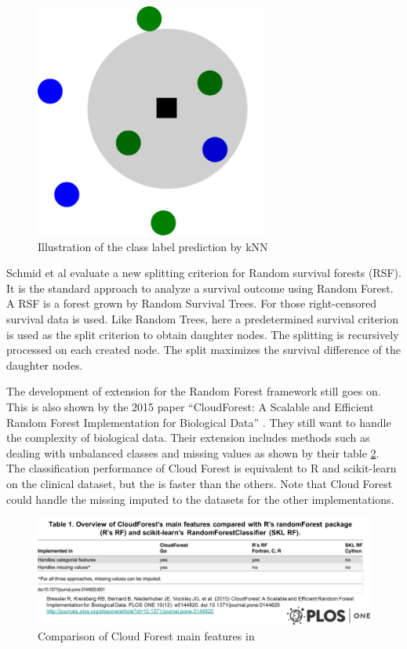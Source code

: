 \documentclass{sig-alternate-05-2015}
\begin{document}
\begin{figure}
\centering
\includegraphics[width=3in]{kNN}
\caption{Illustration of the class label prediction by kNN}
\label{fig:kNN}
\end{figure}

Schmid et al \cite{Schmid2016450} evaluate a new splitting criterion for Random survival forests (RSF). It is the standard approach to analyze a survival outcome using Random Forest. A RSF is a forest grown by Random Survival Trees. For those right-censored
survival data is used. Like Random Trees, here a predetermined survival criterion is used as the split criterion to obtain daughter nodes. The splitting is recursively processed on each created node. The split maximizes the survival difference of the daughter nodes. 

The development of extension for the Random Forest framework still goes on. This is also shown by the 2015 paper ``CloudForest: A Scalable and Efficient Random Forest Implementation for Biological Data'' \cite{10.1371/journal.pone.0144820}. They still want to handle the complexity of biological data. Their extension includes methods such as dealing with unbalanced classes and missing values as shown by their table \ref{fig:cloudrf}. The classification performance of Cloud Forest is equivalent to R and scikit-learn on the clinical dataset, but the is faster than the others. Note that Cloud Forest could handle the missing imputed to the datasets for the other implementations.

\begin{figure}
\centering
\includegraphics[width=5in]{cloudrf}
\caption{Comparison of Cloud Forest main features in \cite{10.1371/journal.pone.0144820}}
\label{fig:cloudrf}
\end{figure}
\end{document}

